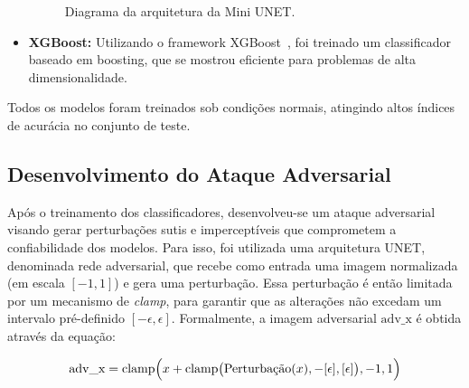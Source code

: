 \documentclass[12pt]{article}
\begin{document}
\begin{itemize}
\begin{figure}[htbp]
              \caption{Diagrama da arquitetura da Mini UNET.}
              \label{fig:mini_unet}
          \end{figure}

    \item \textbf{XGBoost:} Utilizando o framework XGBoost~\cite{Chen_2016}, foi treinado
          um classificador baseado em boosting, que se mostrou eficiente para problemas de alta
          dimensionalidade.
\end{itemize}

Todos os modelos foram treinados sob condições normais, atingindo altos índices
de acurácia no conjunto de teste.

\subsection{Desenvolvimento do Ataque Adversarial}

Após o treinamento dos classificadores, desenvolveu-se um ataque adversarial
visando gerar perturbações sutis e imperceptíveis que comprometem a
confiabilidade dos modelos. Para isso, foi utilizada uma arquitetura UNET,
denominada rede adversarial, que recebe como entrada uma imagem normalizada (em
escala \([-1, 1]\)) e gera uma perturbação. Essa perturbação é então limitada
por um mecanismo de \textit{clamp}, para garantir que as alterações não excedam
um intervalo pré-definido \([-\epsilon, \epsilon]\). Formalmente, a imagem
adversarial \( \text{adv\_x} \) é obtida através da equação:

\[
    \text{adv\_x} = \text{clamp}\Bigl(x + \text{clamp}\bigl(\text{Perturbação}(x), -[\epsilon], [\epsilon]\bigr), -1, 1\Bigr)
\]
\end{document}
